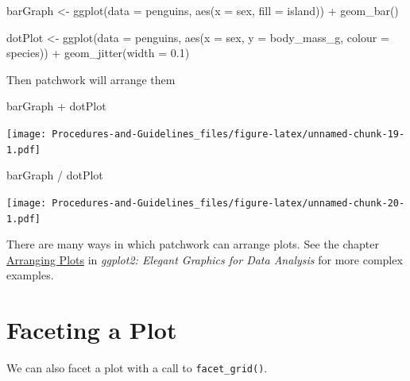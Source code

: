 \documentclass[
]{book}
\newenvironment{Shaded}{\begin{snugshade}}{\end{snugshade}}
\newcommand{\AttributeTok}[1]{\textcolor[rgb]{0.77,0.63,0.00}{#1}}
\newcommand{\FloatTok}[1]{\textcolor[rgb]{0.00,0.00,0.81}{#1}}
\newcommand{\FunctionTok}[1]{\textcolor[rgb]{0.00,0.00,0.00}{#1}}
\newcommand{\NormalTok}[1]{#1}
\newcommand{\OtherTok}[1]{\textcolor[rgb]{0.56,0.35,0.01}{#1}}
\newcommand{\SpecialCharTok}[1]{\textcolor[rgb]{0.00,0.00,0.00}{#1}}
\begin{document}
\begin{Shaded}
\begin{Highlighting}[]
\NormalTok{barGraph }\OtherTok{\textless{}{-}} \FunctionTok{ggplot}\NormalTok{(}\AttributeTok{data =}\NormalTok{ penguins, }\FunctionTok{aes}\NormalTok{(}\AttributeTok{x =}\NormalTok{ sex, }\AttributeTok{fill =}\NormalTok{ island)) }\SpecialCharTok{+}
  \FunctionTok{geom\_bar}\NormalTok{()}

\NormalTok{dotPlot }\OtherTok{\textless{}{-}} \FunctionTok{ggplot}\NormalTok{(}\AttributeTok{data =}\NormalTok{ penguins, }\FunctionTok{aes}\NormalTok{(}\AttributeTok{x =}\NormalTok{ sex, }\AttributeTok{y =}\NormalTok{ body\_mass\_g, }\AttributeTok{colour =}\NormalTok{ species)) }\SpecialCharTok{+}
  \FunctionTok{geom\_jitter}\NormalTok{(}\AttributeTok{width =} \FloatTok{0.1}\NormalTok{)}
\end{Highlighting}
\end{Shaded}

Then patchwork will arrange them

\begin{Shaded}
\begin{Highlighting}[]
\NormalTok{barGraph }\SpecialCharTok{+}\NormalTok{ dotPlot}
\end{Highlighting}
\end{Shaded}

\texttt{[image: Procedures-and-Guidelines\_files/figure-latex/unnamed-chunk-19-1.pdf]}

\begin{Shaded}
\begin{Highlighting}[]
\NormalTok{barGraph }\SpecialCharTok{/}\NormalTok{ dotPlot}
\end{Highlighting}
\end{Shaded}

\texttt{[image: Procedures-and-Guidelines\_files/figure-latex/unnamed-chunk-20-1.pdf]}

There are many ways in which patchwork can arrange plots. See the chapter \href{https://ggplot2-book.org/arranging-plots.html}{Arranging Plots} in \emph{ggplot2: Elegant Graphics for Data Analysis} for more complex examples.

\hypertarget{faceting-a-plot}{%
\section{Faceting a Plot}\label{faceting-a-plot}}

We can also facet a plot with a call to \texttt{facet\_grid()}.
\end{document}
